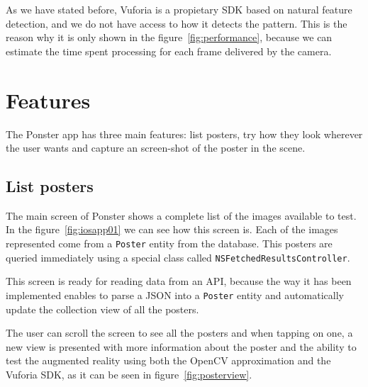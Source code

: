 As we have stated before, Vuforia is a propietary SDK based on natural feature
detection, and we do not have access to how it detects the pattern. This is the
reason why it is only shown in the figure~\ref{fig:performance}, because we can
estimate the time spent processing for each frame delivered by the camera.

\section{Features}
The Ponster app has three main features: list posters, try how they look wherever
the user wants and capture an screen-shot of the poster in the scene. 

\subsection*{List posters}
The main screen of Ponster shows a complete list of the images available to
test. In the figure~\ref{fig:iosapp01} we can see how this screen is. Each of
the images represented come from a \texttt{Poster} entity from the
database. This posters are queried immediately using a special class called
\texttt{NS\-Fetched\-Results\-Controller}. 

This screen is ready for reading data from an API, because the way it has been
implemented enables to parse a JSON into a \texttt{Poster} entity and
automatically update the collection view of all the posters. 

The user can scroll the screen to see all the posters and when tapping on one,
a new view is presented with more information about the poster and the ability
to test the augmented reality using both the OpenCV approximation and the
Vuforia SDK, as it can be seen in figure~\ref{fig:posterview}.

